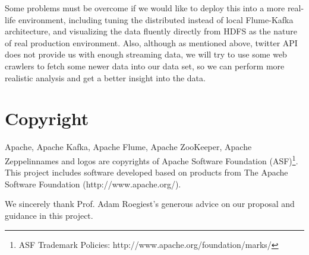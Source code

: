 \documentclass[manuscript, review, screen]{acmart}
\begin{document}
Some problems must be overcome if we would like to deploy this into a more real-life environment, including tuning the distributed instead of local Flume-Kafka architecture, and visualizing the data fluently directly from HDFS as the nature of real production environment. Also, although as mentioned above, twitter API does not provide us with enough streaming data, we will try to use some web crawlers to fetch some newer data into our data set, so we can perform more realistic analysis and get a better insight into the data.

\section{Copyright}
Apache\textregistered, Apache Kafka\textregistered, Apache Flume\texttrademark, Apache ZooKeeper\texttrademark, Apache Zeppelin\texttrademark names and logos are copyrights of Apache Software Foundation (ASF)\footnote{ASF Trademark Policies: http://www.apache.org/foundation/marks/}. This project includes software developed based on products from The Apache Software Foundation (http://www.apache.org/).

\begin{acks}
We sincerely thank Prof. Adam Roegiest's generous advice on our proposal and guidance in this project.
\end{acks}

%


\end{document}
